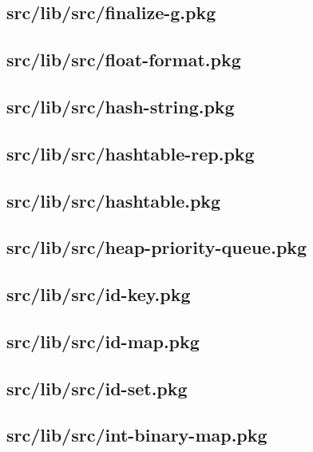 \subsection{src/lib/src/finalize-g.pkg}


\subsection{src/lib/src/float-format.pkg}


\subsection{src/lib/src/hash-string.pkg}


\subsection{src/lib/src/hashtable-rep.pkg}


\subsection{src/lib/src/hashtable.pkg}


\subsection{src/lib/src/heap-priority-queue.pkg}


\subsection{src/lib/src/id-key.pkg}


\subsection{src/lib/src/id-map.pkg}


\subsection{src/lib/src/id-set.pkg}


\subsection{src/lib/src/int-binary-map.pkg}


